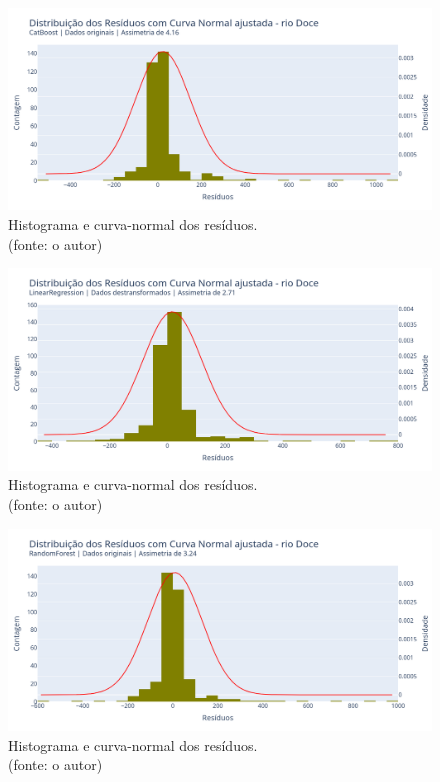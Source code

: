 \begin{figure}[!h]
\centering
\includegraphics[scale=0.33]{Figuras/rio_doce/wfv/CB/CB_WFV_ORIG_RESID_x_CURVA_NORMAL.png}
\caption{Histograma e curva-normal dos resíduos.\\(fonte: o autor)}
\label{fig:doce_CB_WFV_ORIG_RESID_x_CURVA_NORMAL}
\end{figure}

\begin{figure}[!h]
\centering
\includegraphics[scale=0.33]{Figuras/rio_doce/wfv/LR/LR_WFV_LOG_RESID_x_CURVA_NORMAL.png}
\caption{Histograma e curva-normal dos resíduos.\\(fonte: o autor)}
\label{fig:doce_LR_WFV_LOG_RESID_x_CURVA_NORMAL}
\end{figure}

\begin{figure}[!h]
\centering
\includegraphics[scale=0.33]{Figuras/rio_doce/wfv/RF/RF_WFV_ORIG_RESID_x_CURVA_NORMAL.png}
\caption{Histograma e curva-normal dos resíduos.\\(fonte: o autor)}
\label{fig:doce_RF_WFV_ORIG_RESID_x_CURVA_NORMAL}
\end{figure}
\clearpage

